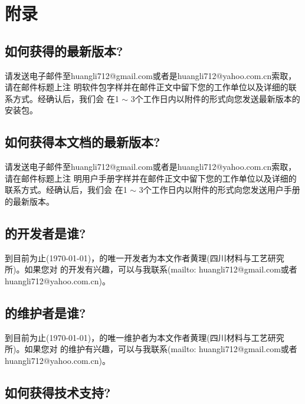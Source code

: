 {
\appendix
\chapter{附录}
\renewcommand\thesection{A.\arabic{section}}
\renewcommand{\theequation}{A.\arabic{equation}}
\renewcommand{\thefigure}{A.\arabic{figure}}

\section{如何获得{\iqist}的最新版本?}
\label{app:get_code}

请发送电子邮件至huangli712@gmail.com或者是huangli712@yahoo.com.cn索取，请在邮件标题上注
明{\iqist}软件包字样并在邮件正文中留下您的工作单位以及详细的联系方式。经确认后，我们会
在1 $\sim$ 3个工作日内以附件的形式向您发送{\iqist}最新版本的安装包。

\section{如何获得本文档的最新版本?}
\label{app:get_doc}

请发送电子邮件至huangli712@gmail.com或者是huangli712@yahoo.com.cn索取，请在邮件标题上注
明{\iqist}用户手册字样并在邮件正文中留下您的工作单位以及详细的联系方式。经确认后，我们会
在1 $\sim$ 3个工作日内以附件的形式向您发送{\iqist}用户手册的最新版本。

\section{\iqist 的开发者是谁?}
\label{app:develop}

到目前为止(\today)，{\iqist}的唯一开发者为本文作者黄理(四川材料与工艺研究所)。如果您对
{\iqist}的开发有兴趣，可以与我联系(mailto: huangli712@gmail.com或者huangli712@yahoo.com.cn)。

\section{\iqist 的维护者是谁?}
\label{app:maintain}

到目前为止(\today)，{\iqist}的唯一维护者为本文作者黄理(四川材料与工艺研究所)。如果您对
{\iqist}的维护有兴趣，可以与我联系(mailto: huangli712@gmail.com或者huangli712@yahoo.com.cn)。

\section{如何获得技术支持?}
\label{app:support}

}
